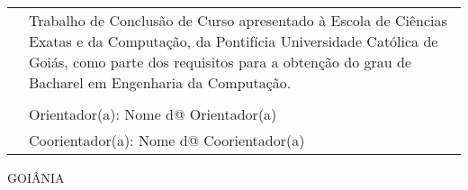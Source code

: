 \begin{center}
    \authorname
    \textbf{\titletcc}
    \begin{tabular}[j]{p{5.8cm}p{9.6cm}}
        & Trabalho de Conclusão de Curso apresentado à 
          Escola de Ciências Exatas e da Computação, da 
          Pontifícia Universidade Católica de Goiás, como 
          parte dos requisitos para a obtenção do grau de 
          Bacharel em Engenharia da Computação. \\
        & \\
        & Orientador(a): Nome d@ Orientador(a) \\
        & Coorientador(a): Nome d@ Coorientador(a) \\
    \end{tabular}
    \begin{bottompar}
        GOIÂNIA \\ \vspace{1mm}
        \the\year
    \end{bottompar}
\end{center}
